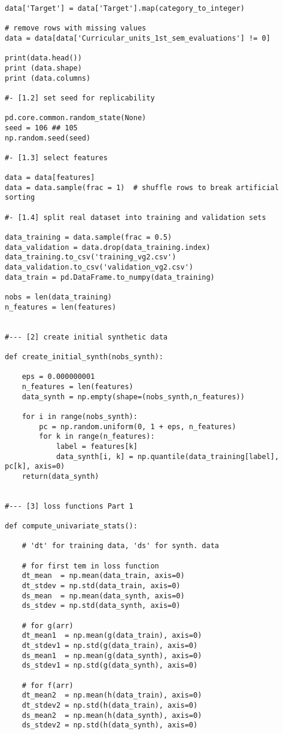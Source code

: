 \documentclass[oneside,10pt]{book}
\begin{document}
\begin{lstlisting}
data['Target'] = data['Target'].map(category_to_integer) 

# remove rows with missing values
data = data[data['Curricular_units_1st_sem_evaluations'] != 0] 

print(data.head()) 
print (data.shape)
print (data.columns)

#- [1.2] set seed for replicability

pd.core.common.random_state(None)
seed = 106 ## 105
np.random.seed(seed)

#- [1.3] select features

data = data[features]
data = data.sample(frac = 1)  # shuffle rows to break artificial sorting

#- [1.4] split real dataset into training and validation sets

data_training = data.sample(frac = 0.5)
data_validation = data.drop(data_training.index)
data_training.to_csv('training_vg2.csv')
data_validation.to_csv('validation_vg2.csv')
data_train = pd.DataFrame.to_numpy(data_training) 

nobs = len(data_training)
n_features = len(features)


#--- [2] create initial synthetic data  

def create_initial_synth(nobs_synth):

    eps = 0.000000001
    n_features = len(features)
    data_synth = np.empty(shape=(nobs_synth,n_features))

    for i in range(nobs_synth):
        pc = np.random.uniform(0, 1 + eps, n_features)
        for k in range(n_features):
            label = features[k]
            data_synth[i, k] = np.quantile(data_training[label], pc[k], axis=0)
    return(data_synth)


#--- [3] loss functions Part 1

def compute_univariate_stats():

    # 'dt' for training data, 'ds' for synth. data

    # for first tem in loss function
    dt_mean  = np.mean(data_train, axis=0)
    dt_stdev = np.std(data_train, axis=0)
    ds_mean  = np.mean(data_synth, axis=0)
    ds_stdev = np.std(data_synth, axis=0)

    # for g(arr)
    dt_mean1  = np.mean(g(data_train), axis=0)
    dt_stdev1 = np.std(g(data_train), axis=0)
    ds_mean1  = np.mean(g(data_synth), axis=0)
    ds_stdev1 = np.std(g(data_synth), axis=0)

    # for f(arr)
    dt_mean2  = np.mean(h(data_train), axis=0)
    dt_stdev2 = np.std(h(data_train), axis=0)
    ds_mean2  = np.mean(h(data_synth), axis=0)
    ds_stdev2 = np.std(h(data_synth), axis=0)


\end{lstlisting}
\end{document}

